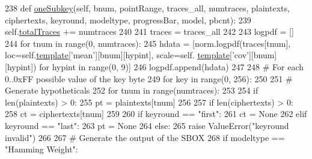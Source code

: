 \begin{DoxyCode}
238     \textcolor{keyword}{def }\hyperlink{classsoftware_1_1chipwhisperer_1_1analyzer_1_1attacks_1_1cpa__algorithms_1_1experimentalchannelinfo_1_1TemplateOneSubkey_a7277d55c322897cd3b9739b27e4ee30b}{oneSubkey}(self, bnum, pointRange, traces\_all, numtraces, plaintexts, ciphertexts, 
      keyround, modeltype, progressBar, model, pbcnt):
239         self.\hyperlink{classsoftware_1_1chipwhisperer_1_1analyzer_1_1attacks_1_1cpa__algorithms_1_1experimentalchannelinfo_1_1TemplateOneSubkey_a761436db7796a3c2118b452fcd74f2fb}{totalTraces} += numtraces
240 
241         traces = traces\_all
242 
243         logpdf = []
244         \textcolor{keywordflow}{for} tnum \textcolor{keywordflow}{in} range(0, numtraces):
245             hdata = [norm.logpdf(traces[tnum], loc=self.\hyperlink{classsoftware_1_1chipwhisperer_1_1analyzer_1_1attacks_1_1cpa__algorithms_1_1experimentalchannelinfo_1_1TemplateOneSubkey_a2c99b3cf2d4152c9361ed3661694bcdc}{template}[\textcolor{stringliteral}{'mean'}][bnum][hypint], scale=self.
      \hyperlink{classsoftware_1_1chipwhisperer_1_1analyzer_1_1attacks_1_1cpa__algorithms_1_1experimentalchannelinfo_1_1TemplateOneSubkey_a2c99b3cf2d4152c9361ed3661694bcdc}{template}[\textcolor{stringliteral}{'cov'}][bnum][hypint]) \textcolor{keywordflow}{for} hypint \textcolor{keywordflow}{in} range(0, 9)]
246             logpdf.append(hdata)
247 
248         \textcolor{comment}{# For each 0..0xFF possible value of the key byte}
249         \textcolor{keywordflow}{for} key \textcolor{keywordflow}{in} range(0, 256):
250 
251             \textcolor{comment}{# Generate hypotheticals}
252             \textcolor{keywordflow}{for} tnum \textcolor{keywordflow}{in} range(numtraces):
253 
254                 \textcolor{keywordflow}{if} len(plaintexts) > 0:
255                     pt = plaintexts[tnum]
256 
257                 \textcolor{keywordflow}{if} len(ciphertexts) > 0:
258                     ct = ciphertexts[tnum]
259 
260                 \textcolor{keywordflow}{if} keyround == \textcolor{stringliteral}{"first"}:
261                     ct = \textcolor{keywordtype}{None}
262                 \textcolor{keywordflow}{elif} keyround == \textcolor{stringliteral}{"last"}:
263                     pt = \textcolor{keywordtype}{None}
264                 \textcolor{keywordflow}{else}:
265                     \textcolor{keywordflow}{raise} ValueError(\textcolor{stringliteral}{"keyround invalid"})
266 
267                 \textcolor{comment}{# Generate the output of the SBOX}
268                 \textcolor{keywordflow}{if} modeltype == \textcolor{stringliteral}{"Hamming Weight"}:

\end{DoxyCode}
